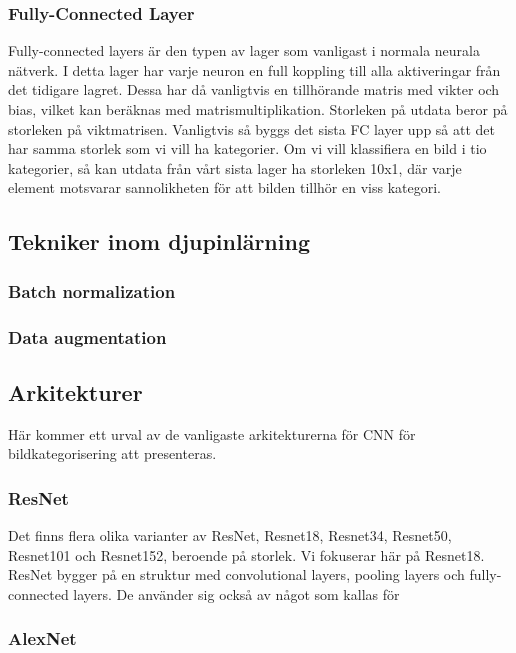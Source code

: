 \documentclass{kththesis}
\begin{document}
      \subsubsection{Fully-Connected Layer}
      Fully-connected layers är den typen av lager som vanligast i normala neurala nätverk.
      I detta lager har varje neuron en full koppling till alla aktiveringar från det tidigare lagret.
      Dessa har då vanligtvis en tillhörande matris med vikter och bias, vilket kan beräknas med matrismultiplikation.
      Storleken på utdata beror på storleken på viktmatrisen.
      Vanligtvis så byggs det sista FC layer upp så att det har samma storlek som vi vill ha kategorier.
      Om vi vill klassifiera en bild i tio kategorier, så kan utdata från vårt sista lager ha storleken 10x1, där varje element motsvarar sannolikheten för att bilden tillhör en viss kategori.

    \subsection{Tekniker inom djupinlärning}

      \subsubsection{Batch normalization}

      \subsubsection{Data augmentation}

    \subsection{Arkitekturer}
    Här kommer ett urval av de vanligaste arkitekturerna för CNN för bildkategorisering att presenteras.

      \subsubsection{ResNet}
      Det finns flera olika varianter av ResNet, Resnet18, Resnet34, Resnet50, Resnet101 och Resnet152, beroende på storlek. Vi fokuserar här på Resnet18.
      ResNet bygger på en struktur med convolutional layers, pooling layers och fully-connected layers.
      De använder sig också av något som kallas för

      \subsubsection{AlexNet}
\end{document}
